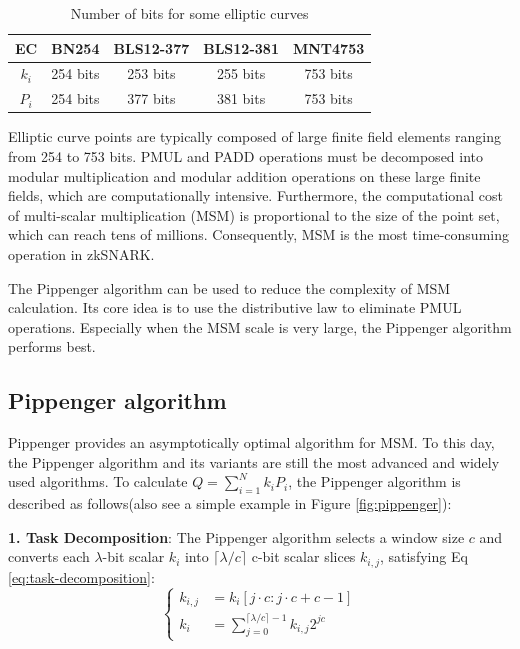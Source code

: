 \documentclass[journal=tches,final]{iacrtrans}
\begin{document}
\begin{table}[htbp]
    \label{tab:elliptic-curves-bits}
    \centering
    \caption{Number of bits for some elliptic curves}
    \begin{tabular}{c|c|c|c|c}
    \toprule
    \textbf{EC} & \textbf{BN254} & \textbf{BLS12-377} & \textbf{BLS12-381} & \textbf{MNT4753} \\
    \midrule
    $k_i$ & 254 bits & 253 bits & 255 bits & 753 bits \\
    $P_i$ & 254 bits & 377 bits & 381 bits & 753 bits \\
    \bottomrule
    \end{tabular}
\end{table}

Elliptic curve points are typically composed of large finite field elements ranging from 254 to 753 bits. PMUL and PADD operations must be decomposed into modular multiplication and modular addition operations on these large finite fields, which are computationally intensive. Furthermore, the computational cost of multi-scalar multiplication (MSM) is proportional to the size of the point set, which can reach tens of millions. Consequently, MSM is the most time-consuming operation in zkSNARK.

The Pippenger algorithm can be used to reduce the complexity of MSM calculation. Its core idea is to use the distributive law to eliminate PMUL operations. Especially when the MSM scale is very large, the Pippenger algorithm performs best.

\subsection{Pippenger algorithm}
Pippenger provides an asymptotically optimal algorithm for MSM. To this day, the Pippenger algorithm and its variants are still the most advanced and widely used algorithms. To calculate $Q=\sum_{i=1}^N k_i P_i$, the Pippenger algorithm is described as follows(also see a simple example in Figure \ref{fig:pippenger}):

\textbf{1. Task Decomposition}: The Pippenger algorithm selects a window size $c$ and converts each $\lambda$-bit scalar $k_i$ into $\lceil \lambda / c \rceil$ c-bit scalar slices $k_{i,j}$, satisfying Eq \eqref{eq:task-decomposition}:
\begin{equation}
\label{eq:task-decomposition}
\left\{
\begin{aligned}
k_{i,j} &= k_i[j \cdot c : j \cdot c + c - 1] \\
k_i &= \sum_{j=0}^{\lceil \lambda / c \rceil - 1} k_{i,j} 2^{j c}
\end{aligned}
\right.
\end{equation}
\end{document}
